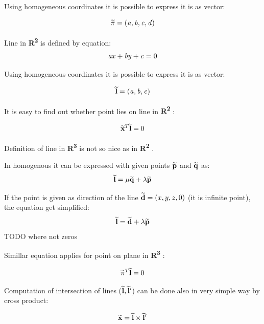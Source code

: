 \documentclass[a4paper,12pt]{report}
\newcommand{\ehvect}[1]{
{\bf \widetilde{#1}}
}
\newcommand{\escal}[1]{
{\it #1}
}
\newcommand{\eucl}[1]{
{\bf R\textsuperscript{#1}}
}
\begin{document}
Using homogeneous coordinates it is possible to express it is as vector:

\begin{equation}
\ehvect{\pi} =  (\escal{a}, \escal{b}, \escal{c}, \escal{d})
\end{equation}


Line in \eucl{2} is defined by equation:
\begin{equation}
\escal{a}\escal{x} + \escal{b}\escal{y} + \escal{c} = 0
\end{equation}

Using homogeneous coordinates it is possible to express it is as vector:

\begin{equation}
\ehvect{l} =  (\escal{a}, \escal{b}, \escal{c})
\end{equation}

It is easy to find out whether point lies on line in \eucl{2}:

\begin{equation}
\ehvect{x}^{T} \ehvect{l} = 0
\end{equation}


Definition of line in \eucl{3} is not so nice as in \eucl{2}.



In homogenous it can be expressed with given points $\ehvect{p}$ and $\ehvect{q}$ as:
\begin{equation}
 \ehvect{l} = \escal{\mu}\ehvect{q} + \escal{\lambda}\ehvect{p}
\end{equation}

If the point is given as direction of the line $\ehvect{d} = (x, y, z, 0)$ (it is infinite point), the equation get simplified:
\begin{equation}
\ehvect{l} = \ehvect{d} + \escal{\lambda}\ehvect{p} \label{eq:hline}
\end{equation}
TODO where not zeros

Simillar equation applies for point on plane in \eucl{3}:

\begin{equation}
\ehvect{\pi}^{T} \ehvect{l} = 0
\end{equation}

Computation of intersection of lines ($\ehvect{l}, \ehvect{l}'$) can be done also in very simple way by cross product:

\begin{equation}
\ehvect{x} = \ehvect{l} \times \ehvect{l}' \label{eq:def_hline_pts}
\end{equation}
\end{document}
